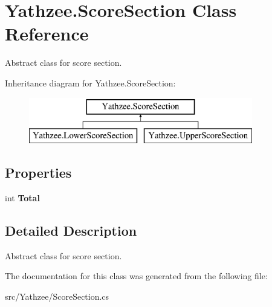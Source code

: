 \hypertarget{class_yathzee_1_1_score_section}{}\section{Yathzee.\+Score\+Section Class Reference}
\label{class_yathzee_1_1_score_section}


Abstract class for score section.  


Inheritance diagram for Yathzee.\+Score\+Section\+:\begin{figure}[H]
\begin{center}
\leavevmode
\includegraphics[height=2.000000cm]{class_yathzee_1_1_score_section}
\end{center}
\end{figure}
\subsection*{Properties}
\begin{DoxyCompactItemize}
\item 
int {\bfseries Total}\hypertarget{class_yathzee_1_1_score_section_a58581bbdd2cda719e5f1dcd7659c412f}{}\label{class_yathzee_1_1_score_section_a58581bbdd2cda719e5f1dcd7659c412f}

\end{DoxyCompactItemize}


\subsection{Detailed Description}
Abstract class for score section. 



The documentation for this class was generated from the following file\+:\begin{DoxyCompactItemize}
\item 
src/\+Yathzee/Score\+Section.\+cs\end{DoxyCompactItemize}
